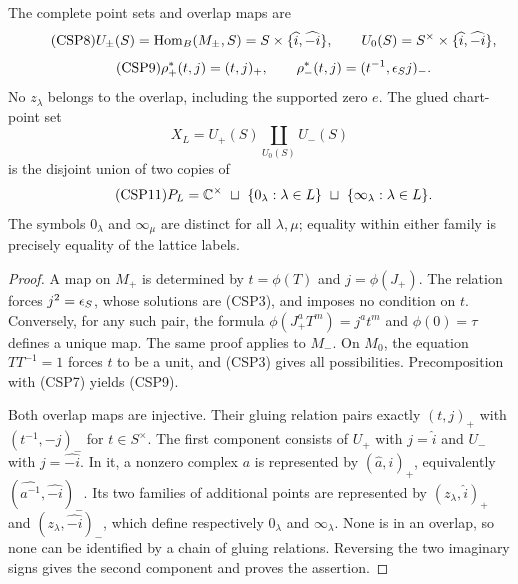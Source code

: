 \begin{theorem}\label{thm:charts}
The complete point sets and overlap maps are
\begin{equation}\tag{CSP8}
 U_\pm(S)=\operatorname{Hom}_B(M_\pm,S)=S\times\{\widehat i,\widehat{-i}\},
 \qquad U_0(S)=S^\times\times\{\widehat i,\widehat{-i}\},
\end{equation}
\begin{equation}\tag{CSP9}
 \rho_+^*(t,j)=(t,j)_+,\qquad
 \rho_-^*(t,j)=(t^{-1},\epsilon_Sj)_-.
\end{equation}
No $z_\lambda$ belongs to the overlap, including the supported zero
$e$.  The glued chart-point set
\begin{equation}\tag{CSP10}
 X_L=U_+(S)\coprod_{U_0(S)}U_-(S)
\end{equation}
is the disjoint union of two copies of
\begin{equation}\tag{CSP11}
 P_L=\mathbb C^\times\ \sqcup\ \{0_\lambda:\lambda\in L\}
                 \ \sqcup\ \{\infty_\lambda:\lambda\in L\}.
\end{equation}
The symbols $0_\lambda$ and $\infty_\mu$ are distinct for all
$\lambda,\mu$; equality within either family is precisely equality of
the lattice labels.
\end{theorem}
\begin{proof}
A map on $M_+$ is determined by $t=\phi(T)$ and
$j=\phi(J_+)$.  The relation forces $j^2=\epsilon_S$, whose solutions
are (CSP3), and imposes no condition on $t$.  Conversely, for any such
pair, the formula $\phi(J_+^aT^m)=j^at^m$ and $\phi(0)=\tau$
defines a unique map.  The same proof applies to $M_-$.  On $M_0$,
the equation $TT^{-1}=1$ forces $t$ to be a unit, and (CSP3) gives
all possibilities.  Precomposition with (CSP7) yields (CSP9).

Both overlap maps are injective.  Their gluing relation pairs exactly
$(t,j)_+$ with $(t^{-1},-j)_-$ for $t\in S^\times$.  The first
component consists of $U_+$ with $j=\widehat i$ and $U_-$ with
$j=\widehat{-i}$.  In it, a nonzero complex $a$ is represented by
$(\widehat a,\widehat i)_+$, equivalently
$(\widehat{a^{-1}},\widehat{-i})_-$.  Its two families of additional
points are represented by $(z_\lambda,\widehat i)_+$ and
$(z_\lambda,\widehat{-i})_-$, which define respectively
$0_\lambda$ and $\infty_\lambda$.  None is in an overlap, so none
can be identified by a chain of gluing relations.  Reversing the two
imaginary signs gives the second component and proves the assertion.
\end{proof}

